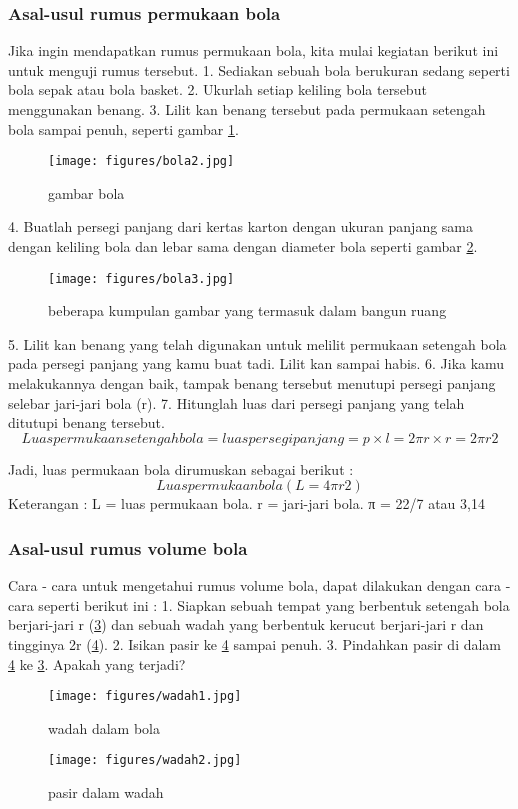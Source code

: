 \subsubsection{Asal-usul rumus permukaan bola}
Jika ingin mendapatkan rumus permukaan bola, kita mulai kegiatan berikut ini untuk menguji rumus tersebut.
1. Sediakan sebuah bola berukuran sedang seperti bola sepak atau bola basket.
2. Ukurlah setiap keliling bola tersebut menggunakan benang.
3. Lilit kan benang tersebut pada permukaan setengah bola sampai penuh, seperti gambar \ref{bola2}.
\begin{figure}[ht]
    \centerline{\texttt{[image: figures/bola2.jpg]}}
    \caption{gambar bola}
    \label{bola2}
    \end{figure}
4. Buatlah persegi panjang dari kertas karton dengan ukuran panjang sama dengan keliling bola dan lebar sama dengan diameter bola seperti gambar \ref{bola3}.
\begin{figure}[ht]
    \centerline{\texttt{[image: figures/bola3.jpg]}}
    \caption{beberapa kumpulan gambar yang termasuk dalam bangun ruang}
    \label{bola3}
    \end{figure}
5. Lilit kan benang yang telah digunakan untuk melilit permukaan setengah bola pada persegi panjang yang kamu buat tadi. Lilit kan sampai habis.
6. Jika kamu melakukannya dengan baik, tampak benang tersebut menutupi persegi panjang selebar jari-jari bola (r).
7. Hitunglah luas dari persegi panjang yang telah ditutupi benang tersebut. 
\begin{equation}
Luas permukaan setengah bola = luas persegi panjang
                                           = p × l
                                           = 2πr× r
                                           = 2π r2
\end{equation}

Jadi, luas permukaan bola dirumuskan sebagai berikut :
\begin{equation}
Luas permukaan bola ( L = 4πr2 )
\end{equation}
Keterangan :
L = luas permukaan bola.
r = jari-jari bola.
π = 22/7 atau 3,14

\subsubsection{Asal-usul rumus volume bola}
Cara - cara untuk mengetahui rumus volume bola, dapat dilakukan dengan cara - cara seperti berikut ini : 
1. Siapkan sebuah tempat yang berbentuk setengah bola berjari-jari r (\ref{wadah1}) dan sebuah wadah yang berbentuk kerucut berjari-jari r dan tingginya 2r (\ref{wadah2}).
2. Isikan pasir ke \ref{wadah2} sampai penuh.
3. Pindahkan pasir di dalam \ref{wadah2} ke \ref{wadah1}. Apakah yang terjadi?
\begin{figure}[ht]
    \centerline{\texttt{[image: figures/wadah1.jpg]}}
    \caption{wadah dalam bola}
    \label{wadah1}
    \end{figure}
\begin{figure}[ht]
    \centerline{\texttt{[image: figures/wadah2.jpg]}}
    \caption{pasir dalam wadah}
    \label{wadah2}
    \end{figure}

